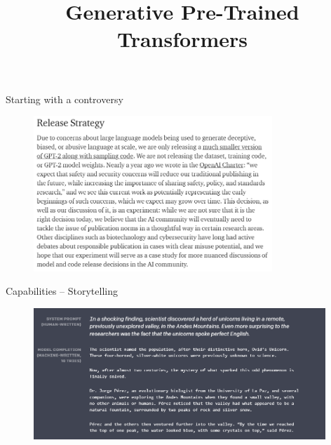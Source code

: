 



\newcommand{\titlefigure}{figure/gpt2-title.png}
\newcommand{\learninggoals}{
\item Get a first idea about prompting
\item Understand the implications of such models}

\title{Generative Pre-Trained Transformers}
\date{}




\begin{frame}{Starting with a controversy}

\vfill

\begin{figure}
\centering
\includegraphics[width = 9cm]{figure/72-gpt2-release.png}\\ 
\end{figure}

\vfill

\end{frame}


\begin{frame}{Capabilities -- Storytelling}

\vfill

\begin{figure}
\centering
\includegraphics[width = 11cm]{figure/72-gpt2-story.png}\\ 
\end{figure}

\vfill

\end{frame}

